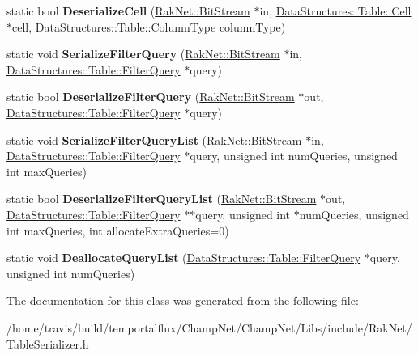 \begin{DoxyCompactItemize}
\item 
\hypertarget{class_rak_net_1_1_table_serializer_aae618915bdcdb2c25520eec121765916}{static bool {\bfseries Deserialize\-Cell} (\hyperlink{class_rak_net_1_1_bit_stream}{Rak\-Net\-::\-Bit\-Stream} $\ast$in, \hyperlink{struct_data_structures_1_1_table_1_1_cell}{Data\-Structures\-::\-Table\-::\-Cell} $\ast$cell, Data\-Structures\-::\-Table\-::\-Column\-Type column\-Type)}\label{class_rak_net_1_1_table_serializer_aae618915bdcdb2c25520eec121765916}

\item 
\hypertarget{class_rak_net_1_1_table_serializer_a4d0d4eda273f26e310a484b24b734461}{static void {\bfseries Serialize\-Filter\-Query} (\hyperlink{class_rak_net_1_1_bit_stream}{Rak\-Net\-::\-Bit\-Stream} $\ast$in, \hyperlink{struct_data_structures_1_1_table_1_1_filter_query}{Data\-Structures\-::\-Table\-::\-Filter\-Query} $\ast$query)}\label{class_rak_net_1_1_table_serializer_a4d0d4eda273f26e310a484b24b734461}

\item 
\hypertarget{class_rak_net_1_1_table_serializer_a103465f5e920541ffea3a6ccaddfff96}{static bool {\bfseries Deserialize\-Filter\-Query} (\hyperlink{class_rak_net_1_1_bit_stream}{Rak\-Net\-::\-Bit\-Stream} $\ast$out, \hyperlink{struct_data_structures_1_1_table_1_1_filter_query}{Data\-Structures\-::\-Table\-::\-Filter\-Query} $\ast$query)}\label{class_rak_net_1_1_table_serializer_a103465f5e920541ffea3a6ccaddfff96}

\item 
\hypertarget{class_rak_net_1_1_table_serializer_a706544887bbe1aeb671deafdec741ac2}{static void {\bfseries Serialize\-Filter\-Query\-List} (\hyperlink{class_rak_net_1_1_bit_stream}{Rak\-Net\-::\-Bit\-Stream} $\ast$in, \hyperlink{struct_data_structures_1_1_table_1_1_filter_query}{Data\-Structures\-::\-Table\-::\-Filter\-Query} $\ast$query, unsigned int num\-Queries, unsigned int max\-Queries)}\label{class_rak_net_1_1_table_serializer_a706544887bbe1aeb671deafdec741ac2}

\item 
\hypertarget{class_rak_net_1_1_table_serializer_abcb0cbbfe356ce29fe74e16b54e4389a}{static bool {\bfseries Deserialize\-Filter\-Query\-List} (\hyperlink{class_rak_net_1_1_bit_stream}{Rak\-Net\-::\-Bit\-Stream} $\ast$out, \hyperlink{struct_data_structures_1_1_table_1_1_filter_query}{Data\-Structures\-::\-Table\-::\-Filter\-Query} $\ast$$\ast$query, unsigned int $\ast$num\-Queries, unsigned int max\-Queries, int allocate\-Extra\-Queries=0)}\label{class_rak_net_1_1_table_serializer_abcb0cbbfe356ce29fe74e16b54e4389a}

\item 
\hypertarget{class_rak_net_1_1_table_serializer_a452588c89fad0798d085b397d6cab8f8}{static void {\bfseries Deallocate\-Query\-List} (\hyperlink{struct_data_structures_1_1_table_1_1_filter_query}{Data\-Structures\-::\-Table\-::\-Filter\-Query} $\ast$query, unsigned int num\-Queries)}\label{class_rak_net_1_1_table_serializer_a452588c89fad0798d085b397d6cab8f8}

\end{DoxyCompactItemize}


The documentation for this class was generated from the following file\-:\begin{DoxyCompactItemize}
\item 
/home/travis/build/temportalflux/\-Champ\-Net/\-Champ\-Net/\-Libs/include/\-Rak\-Net/Table\-Serializer.\-h\end{DoxyCompactItemize}
